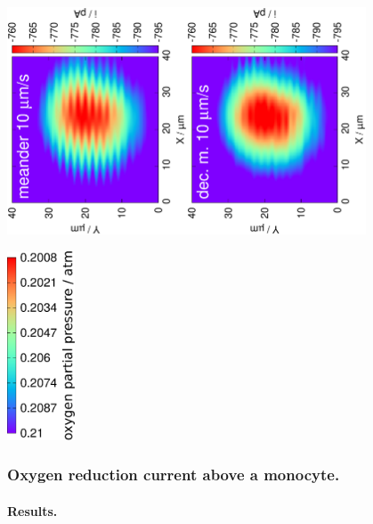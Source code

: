 \documentclass{beamer}
\begin{document}
\begin{frame}
        \centering
        \includegraphics[trim = 10mm 20mm 0mm 20mm, clip, width=0.4\textwidth, angle=-90]{9_41.eps}\includegraphics[trim = 10mm 20mm 0mm 20mm, clip, width=0.4\textwidth, angle=-90]{9_41_meandered_deconvoluted.eps}

\includegraphics[width=0.15\textwidth, angle=-90]{atm.eps}


\frametitle{Oxygen reduction current above a monocyte.}
        \framesubtitle{Results.}
\vfill
\end{frame}
\end{document}
